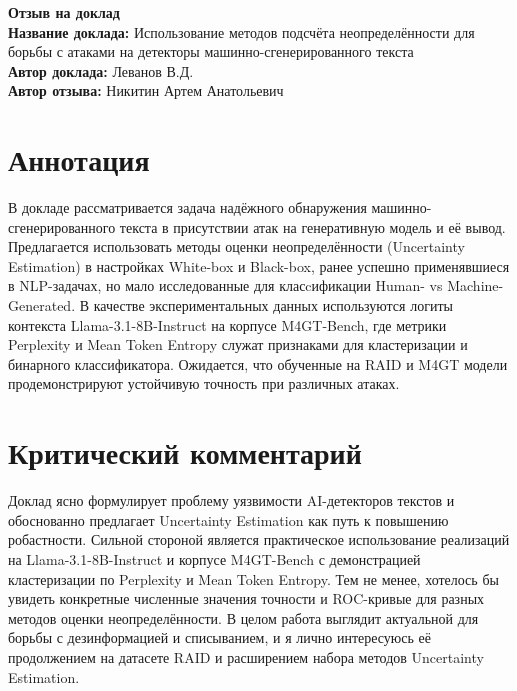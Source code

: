 \documentclass[11pt]{article}
\begin{document}
\begin{center}
    {\Large \textbf{Отзыв на доклад}}\\[1em]
    {\large \textbf{Название доклада:} Использование методов подсчёта неопределённости для борьбы с атаками на детекторы машинно-сгенерированного текста}\\[0.5em]
    {\large \textbf{Автор доклада:} Леванов В.Д.}\\[0.5em]
    {\large \textbf{Автор отзыва:} Никитин Артем Анатольевич}\\[2em]
\end{center}

\section*{Аннотация}
В докладе рассматривается задача надёжного обнаружения машинно-сгенерированного текста в присутствии атак на генеративную
модель и её вывод. Предлагается использовать методы оценки неопределённости (Uncertainty Estimation) в настройках White-box
и Black-box, ранее успешно применявшиеся в NLP-задачах, но мало исследованные для класcификации Human- vs Machine-Generated.
В качестве экспериментальных данных используются логиты контекста Llama-3.1-8B-Instruct на корпусе M4GT-Bench, где метрики
Perplexity и Mean Token Entropy служат признаками для кластеризации и бинарного классификатора. Ожидается, что обученные на 
RAID и M4GT модели продемонстрируют устойчивую точность при различных атаках.

\section*{Критический комментарий}
Доклад ясно формулирует проблему уязвимости AI-детекторов текстов и обоснованно предлагает Uncertainty Estimation как путь 
к повышению робастности. Сильной стороной является практическое использование реализаций на Llama-3.1-8B-Instruct и корпусе 
M4GT-Bench с демонстрацией кластеризации по Perplexity и Mean Token Entropy. Тем не менее, хотелось бы увидеть конкретные 
численные значения точности и ROC-кривые для разных методов оценки неопределённости. В целом работа выглядит актуальной 
для борьбы с дезинформацией и списыванием, и я лично интересуюсь её продолжением на датасете RAID и расширением набора 
методов Uncertainty Estimation.
\end{document}
